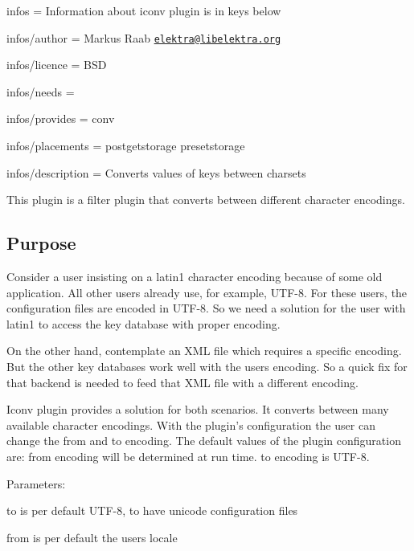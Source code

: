 
\begin{DoxyItemize}
\item infos = Information about iconv plugin is in keys below
\item infos/author = Markus Raab \href{mailto:elektra@libelektra.org}{\tt elektra@libelektra.\+org}
\item infos/licence = B\+S\+D
\item infos/needs =
\item infos/provides = conv
\item infos/placements = postgetstorage presetstorage
\item infos/description = Converts values of keys between charsets
\end{DoxyItemize}

This plugin is a filter plugin that converts between different character encodings.

\subsection*{Purpose}

Consider a user insisting on a {\ttfamily latin1} character encoding because of some old application. All other users already use, for example, {\ttfamily U\+T\+F-\/8}. For these users, the configuration files are encoded in {\ttfamily U\+T\+F-\/8}. So we need a solution for the user with {\ttfamily latin1} to access the key database with proper encoding.

On the other hand, contemplate an X\+M\+L file which requires a specific encoding. But the other key databases work well with the users encoding. So a quick fix for that backend is needed to feed that X\+M\+L file with a different encoding.

Iconv plugin provides a solution for both scenarios. It converts between many available character encodings. With the plugin’s configuration the user can change the from and to encoding. The default values of the plugin configuration are\+: {\ttfamily from} encoding will be determined at run time. {\ttfamily to} encoding is {\ttfamily U\+T\+F-\/8}.

Parameters\+:
\begin{DoxyItemize}
\item {\ttfamily to} is per default U\+T\+F-\/8, to have unicode configuration files
\item {\ttfamily from} is per default the users locale
\end{DoxyItemize}

